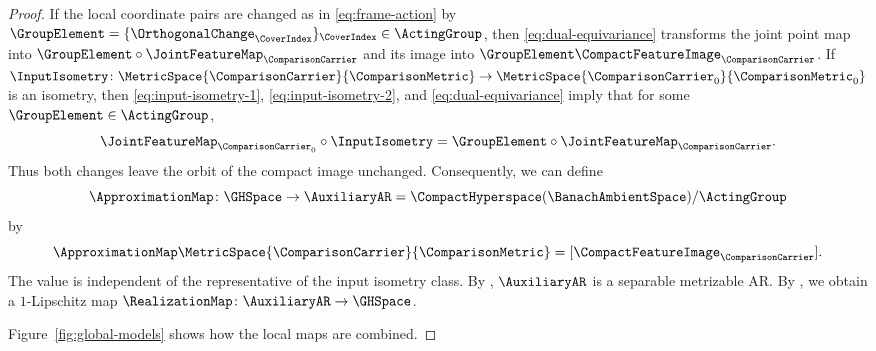 \begin{proof}
If the local coordinate pairs are changed as in \eqref{eq:frame-action} by
$\GroupElement=\{\OrthogonalChange_\CoverIndex\}_\CoverIndex\in\ActingGroup$,
then \eqref{eq:dual-equivariance} transforms the joint point map into
$\GroupElement\circ\JointFeatureMap_\ComparisonCarrier$
and its image into
$\GroupElement\CompactFeatureImage_\ComparisonCarrier$.
If
$\InputIsometry\colon\MetricSpace{\ComparisonCarrier}{\ComparisonMetric}
 \to\MetricSpace{\ComparisonCarrier_0}{\ComparisonMetric_0}$
is an isometry,
then
\eqref{eq:input-isometry-1},
\eqref{eq:input-isometry-2},
and \eqref{eq:dual-equivariance}
imply that for some
$\GroupElement\in\ActingGroup$,
\[
 \JointFeatureMap_{\ComparisonCarrier_0}\circ\InputIsometry
 =\GroupElement\circ\JointFeatureMap_\ComparisonCarrier.
\]
Thus both changes leave the orbit of the compact image unchanged.
Consequently,
we can define
\[
 \ApproximationMap\colon \GHSpace\to \AuxiliaryAR=\CompactHyperspace(\BanachAmbientSpace )/\ActingGroup
\]
by
\[
 \ApproximationMap\MetricSpace{\ComparisonCarrier }{\ComparisonMetric }=[\CompactFeatureImage _\ComparisonCarrier ].
\]
The value is independent of the representative of the input isometry class.
By ,
$\AuxiliaryAR$
is a separable metrizable AR.
By ,
we obtain a
$1$-Lipschitz map
$\RealizationMap\colon \AuxiliaryAR\to\GHSpace$.

Figure~\ref{fig:global-models} shows how the local maps are combined.



\end{proof}
